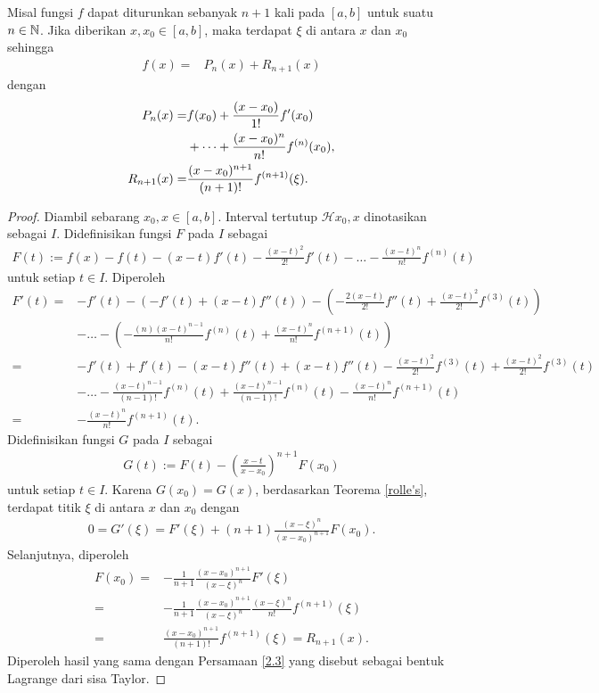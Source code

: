 \begin{teorema}\label{TeoremaTaylor}
    Misal fungsi $f$ dapat diturunkan sebanyak $n+1$ kali pada $[a,b]$ untuk suatu $n \in \mathbb{N}$. Jika diberikan $x,x_0\in[a,b]$, maka terdapat $\xi$ di antara $x$ dan $x_0$ sehingga
    \begin{align}
        f(x)=&P_n(x)+R_{n+1}(x)
    \end{align} 
    dengan
    \begin{align}
 P_n(x)=&f(x_0)+\frac{(x-x_0)}{1!}f'(x_0)\notag\\
        &+\dots+\frac{(x-x_0)^n}{n!}f^{(n)}(x_0),\\
        R_{n+1}(x)=&\frac{(x-x_0)^{n+1}}{(n+1)!}f^{(n+1)}(\xi).\label{2.3}
    \end{align}
\end{teorema}
\begin{proof}
    Diambil sebarang $x_0,x \in [a,b]$. Interval tertutup $\mathcal{H}{x_0,x}$ dinotasikan sebagai $I$. Didefinisikan fungsi $F$ pada $I$ sebagai
    \begin{align*}
        F(t):=f(x)-f(t)-(x-t)f'(t)-\frac{(x-t)^2}{2!}f'(t)-\dots-\frac{(x-t)^n}{n!}f^{(n)}(t)
    \end{align*}
    untuk setiap $t \in I$. Diperoleh
    \begin{align*}
        F'(t)=&-f'(t)-(-f'(t)+(x-t)f''(t))-(-\frac{2(x-t)}{2!}f''(t)+\frac{(x-t)^2}{2!}f^{(3)}(t))\\
        &-\dots-(-\frac{(n)(x-t)^{n-1}}{n!}f^{(n)}(t)+\frac{(x-t)^n}{n!}f^{(n+1)}(t))\\
        =&-f'(t)+f'(t)-(x-t)f''(t)+(x-t)f''(t)-\frac{(x-t)^2}{2!}f^{(3)}(t)+\frac{(x-t)^2}{2!}f^{(3)}(t)\\
        &-\dots-\frac{(x-t)^{n-1}}{(n-1)!}f^{(n)}(t)+\frac{(x-t)^{n-1}}{(n-1)!}f^{(n)}(t)-\frac{(x-t)^n}{n!}f^{(n+1)}(t)\\
        =&-\frac{(x-t)^n}{n!}f^{(n+1)}(t).
    \end{align*}
    Didefinisikan fungsi $G$ pada $I$ sebagai
    \begin{align*}
        G(t):=F(t)-\left(\frac{x-t}{x-x_0}\right)^{n+1}F(x_0)
    \end{align*}
    untuk setiap $t \in I$. Karena $G(x_0)=G(x)$, berdasarkan Teorema \ref{rolle's}, terdapat titik $\xi$ di antara $x$ dan $x_0$ dengan
    \begin{align*}
        0=G'(\xi)=F'(\xi) + (n+1)\frac{(x-\xi)^n}{(x-x_0)^{n+1}}F(x_0).
    \end{align*}
    Selanjutnya, diperoleh
    \begin{align*}
        F(x_0)=&-\frac{1}{n+1}\frac{(x-x_0)^{n+1}}{(x-\xi)^n}F'(\xi)\\
        =&-\frac{1}{n+1}\frac{(x-x_0)^{n+1}}{(x-\xi)^n}\frac{(x-\xi)^n}{n!}f^{(n+1)}(\xi)\\
        =&\frac{(x-x_0)^{n+1}}{(n+1)!}f^{(n+1)}(\xi)=R_{n+1}(x).
    \end{align*}
    Diperoleh hasil yang sama dengan Persamaan \eqref{2.3} yang disebut sebagai bentuk Lagrange dari sisa Taylor.
\end{proof}

